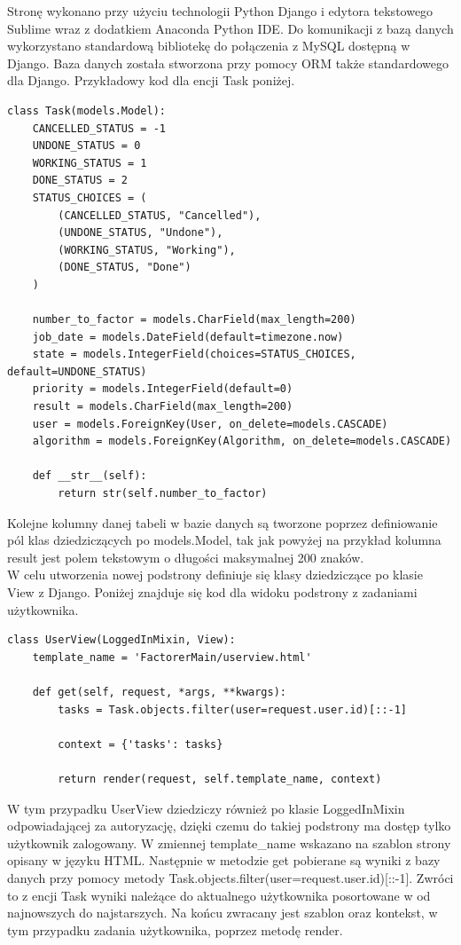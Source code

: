 \documentclass{article}
\begin{document}
Stronę wykonano przy użyciu technologii Python Django\cite{django} i edytora tekstowego Sublime\cite{sublime} wraz z dodatkiem Anaconda Python IDE\cite{anacondaide}. Do komunikacji z bazą danych wykorzystano standardową bibliotekę do połączenia z MySQL dostępną w Django. Baza danych została stworzona przy pomocy ORM\cite{orminfo} także standardowego dla Django. Przykładowy kod dla encji Task poniżej.

\begin{lstlisting}
class Task(models.Model):
    CANCELLED_STATUS = -1
    UNDONE_STATUS = 0
    WORKING_STATUS = 1
    DONE_STATUS = 2
    STATUS_CHOICES = (
        (CANCELLED_STATUS, "Cancelled"),
        (UNDONE_STATUS, "Undone"),
        (WORKING_STATUS, "Working"),
        (DONE_STATUS, "Done")
    )

    number_to_factor = models.CharField(max_length=200)
    job_date = models.DateField(default=timezone.now)
    state = models.IntegerField(choices=STATUS_CHOICES, default=UNDONE_STATUS)
    priority = models.IntegerField(default=0)
    result = models.CharField(max_length=200)
    user = models.ForeignKey(User, on_delete=models.CASCADE)
    algorithm = models.ForeignKey(Algorithm, on_delete=models.CASCADE)

    def __str__(self):
        return str(self.number_to_factor)
\end{lstlisting}

Kolejne kolumny danej tabeli w bazie danych są tworzone poprzez definiowanie pól klas dziedziczących po models.Model\cite{djangomodels}, tak jak powyżej na przykład kolumna result jest polem tekstowym o długości maksymalnej 200 znaków. \\

W celu utworzenia nowej podstrony definiuje się klasy dziedziczące po klasie View z Django. Poniżej znajduje się kod dla widoku podstrony z zadaniami użytkownika.

\begin{lstlisting}
class UserView(LoggedInMixin, View):
    template_name = 'FactorerMain/userview.html'

    def get(self, request, *args, **kwargs):
        tasks = Task.objects.filter(user=request.user.id)[::-1]

        context = {'tasks': tasks}

        return render(request, self.template_name, context)
\end{lstlisting}

W tym przypadku UserView dziedziczy również po klasie LoggedInMixin odpowiadającej za autoryzację, dzięki czemu do takiej podstrony ma dostęp tylko użytkownik zalogowany. W zmiennej template\_name wskazano na szablon strony opisany w języku HTML. Następnie w metodzie get pobierane są wyniki z bazy danych przy pomocy metody Task.objects.filter(user=request.user.id)[::-1]. Zwróci to z encji Task wyniki należące do aktualnego użytkownika posortowane w od najnowszych do najstarszych. Na końcu zwracany jest szablon oraz kontekst, w tym przypadku zadania użytkownika, poprzez metodę render.\\
\end{document}
